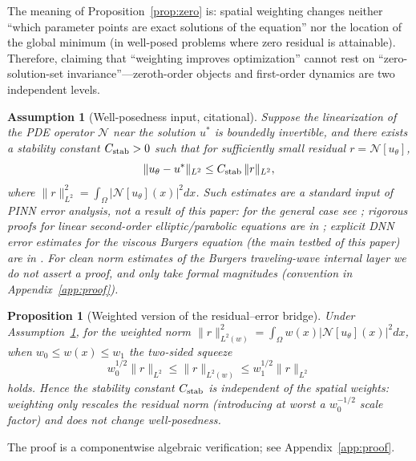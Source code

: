\documentclass[11pt]{article}
\newtheorem{assumption}{Assumption}[section]
\newtheorem{proposition}{Proposition}[section]
\numberwithin{equation}{section}
\begin{document}
The meaning of Proposition~\ref{prop:zero} is: spatial weighting changes neither ``which parameter points are exact solutions of the equation'' nor the location of the global minimum (in well-posed problems where zero residual is attainable). Therefore, claiming that ``weighting improves optimization'' cannot rest on ``zero-solution-set invariance''---zeroth-order objects and first-order dynamics are two independent levels.

\begin{assumption}[Well-posedness input, citational]\label{ass:wellposed}
Suppose the linearization of the PDE operator $\mathcal N$ near the solution $u^*$ is boundedly invertible, and there exists a stability constant $C_{\rm stab}>0$ such that for sufficiently small residual $r=\mathcal N[u_\theta]$,
\begin{equation}\label{eq:bridge}
\|u_\theta-u^*\|_{L^2}\le C_{\rm stab}\,\|r\|_{L^2},
\end{equation}
where $\|r\|_{L^2}^2=\int_\Omega |\mathcal N[u_\theta](x)|^2 dx$. Such estimates are a \emph{standard input} of PINN error analysis, not a result of this paper: for the general case see \cite{MishraMolinaro2020,DeRyckMishra2022}; rigorous proofs for linear second-order elliptic/parabolic equations are in \cite{Shin2020}; explicit DNN error estimates for the viscous Burgers equation (the main testbed of this paper) are in \cite{Akram2025}. For clean norm estimates of the Burgers traveling-wave internal layer we do not assert a proof, and only take formal magnitudes (convention in Appendix~\ref{app:proof}).
\end{assumption}

\begin{proposition}[Weighted version of the residual--error bridge]\label{prop:bridge}
Under Assumption~\ref{ass:wellposed}, for the weighted norm $\|r\|_{L^2(w)}^2=\int_\Omega w(x)|\mathcal N[u_\theta](x)|^2 dx$, when $w_0\le w(x)\le w_1$ the two-sided squeeze
\begin{equation}\label{eq:bridge-weighted}
w_0^{1/2}\|r\|_{L^2}\le \|r\|_{L^2(w)}\le w_1^{1/2}\|r\|_{L^2}
\end{equation}
holds. Hence the stability constant $C_{\rm stab}$ is independent of the spatial weights: weighting only rescales the residual norm (introducing at worst a $w_0^{-1/2}$ scale factor) and does not change well-posedness.
\end{proposition}
The proof is a componentwise algebraic verification; see Appendix~\ref{app:proof}.
\end{document}
